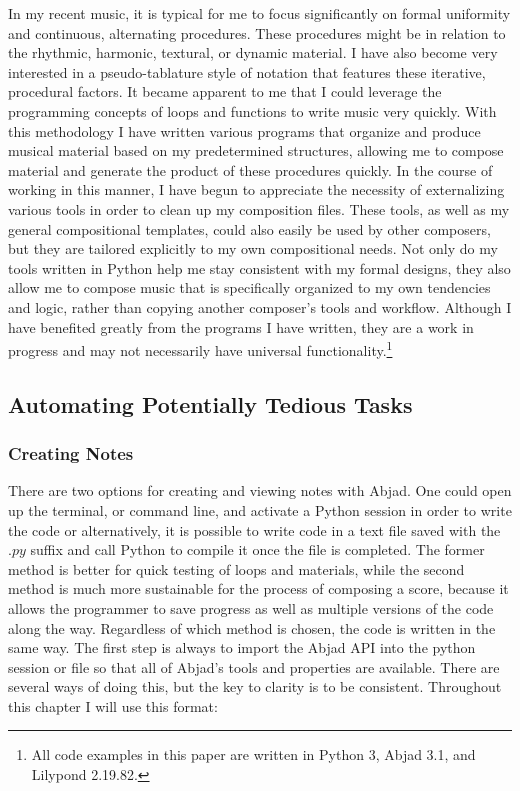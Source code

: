 In my recent music, it is typical for me to focus significantly on formal uniformity and continuous, alternating procedures. These procedures might be in relation to the rhythmic, harmonic, textural, or dynamic material. I have also become very interested in a pseudo-tablature style of notation that features these iterative, procedural factors. It became apparent to me that I could leverage the programming concepts of loops and functions to write music very quickly. With this methodology I have written various programs that organize and produce musical material based on my predetermined structures, allowing me to compose material and generate the product of these procedures quickly. In the course of working in this manner, I have begun to appreciate the necessity of externalizing various tools in order to clean up my composition files. These tools, as well as my general compositional templates, could also easily be used by other composers, but they are tailored explicitly to my own compositional needs. Not only do my tools written in Python help me stay consistent with my formal designs, they also allow me to compose music that is specifically organized to my own tendencies and logic, rather than copying another composer’s tools and workflow. Although I have benefited greatly from the programs I have written, they are a work in progress and may not necessarily have universal functionality.\footnote{All code examples in this paper are written in Python 3, Abjad 3.1, and Lilypond 2.19.82.}

\subsection{Automating Potentially Tedious Tasks}

\subsubsection{Creating Notes}

There are two options for creating and viewing notes with Abjad. One could open up the terminal, or command line, and activate a Python session in order to write the code or alternatively, it is possible to write code in a text file saved with the $.py$ suffix and call Python to compile it once the file is completed. The former method is better for quick testing of loops and materials, while the second method is much more sustainable for the process of composing a score, because it allows the programmer to save progress as well as multiple versions of the code along the way. Regardless of which method is chosen, the code is written in the same way. The first step is always to import the Abjad API into the python session or file so that all of Abjad’s tools and properties are available. There are several ways of doing this, but the key to clarity is to be consistent. Throughout this chapter I will use this format:

